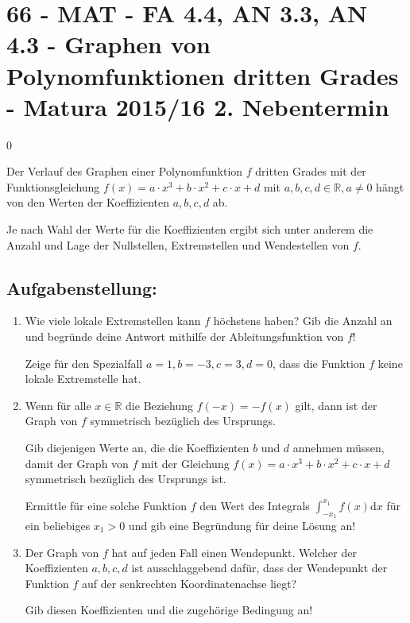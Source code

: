 \section{66 - MAT - FA 4.4, AN 3.3, AN 4.3 - Graphen von Polynomfunktionen dritten Grades - Matura 2015/16 2. Nebentermin}

\begin{langesbeispiel} \item[0] %
	
Der Verlauf des Graphen einer Polynomfunktion $f$ dritten Grades mit der Funktionsgleichung $f(x)=a\cdot x^3+b\cdot x^2+c\cdot x+d$ mit $a,b,c,d\in\mathbb{R}, a\neq 0$ hängt von den Werten der Koeffizienten $a,b,c,d$ ab.

Je nach Wahl der Werte für die Koeffizienten ergibt sich unter anderem die Anzahl und Lage der Nullstellen, Extremstellen und Wendestellen von $f$. 

\subsection{Aufgabenstellung:}
\begin{enumerate}
	\item Wie viele lokale Extremstellen kann $f$ höchstens haben? Gib die Anzahl an und begründe deine Antwort mithilfe der Ableitungsfunktion von $f$! \leer
	
	 Zeige für den Spezialfall $a=1, b=-3, c=3, d=0$, dass die Funktion $f$ keine lokale Extremstelle hat.\leer
	
	\item Wenn für alle $x\in\mathbb{R}$ die Beziehung $f(-x)=-f(x)$ gilt, dann ist der Graph von $f$ symmetrisch bezüglich des Ursprungs.\leer
	
	Gib diejenigen Werte an, die die Koeffizienten $b$ und $d$ annehmen müssen, damit der Graph von $f$ mit der Gleichung $f(x)=a\cdot x^3+b\cdot x^2+c\cdot x+d$ symmetrisch bezüglich des Ursprungs ist.\leer
	
	Ermittle für eine solche Funktion $f$ den Wert des Integrals $\int^{x_1}_{-x_1}{f(x)}$d$x$ für ein beliebiges $x_1>0$ und gib eine Begründung für deine Lösung an!\leer
	
	\item Der Graph von $f$ hat auf jeden Fall einen Wendepunkt. Welcher der Koeffizienten $a, b, c, d$ ist ausschlaggebend dafür, dass der Wendepunkt der Funktion $f$ auf der senkrechten Koordinatenachse liegt? 
	
	Gib diesen Koeffizienten und die zugehörige Bedingung an!\leer
	

\end{enumerate}
\end{langesbeispiel}
